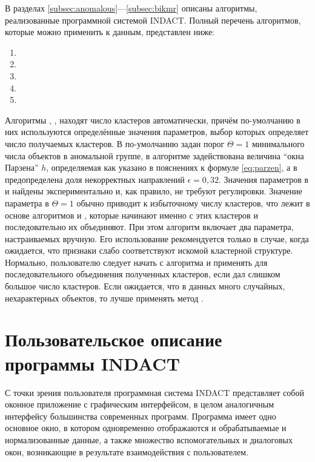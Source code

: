 \documentclass[12pt]{diploma}
\begin{document}
	В разделах \ref{subsec:anomalous}---\ref{subsec:bikmr} описаны алгоритмы, реализованные программной системой INDACT. Полный  перечень алгоритмов, которые можно применить к данным, представлен ниже:
	
	\begin{enumerate}
		\item \ikmeans
		\item \AWard
		\item \AWardpb
		\item \dePDDP
		\item \BiKMR
	\end{enumerate}
	
	
	Алгоритмы \ikmeans, \dePDDP, \BiKMR находят число кластеров автоматически, причём по-умолчанию в них используются определённые значения параметров, выбор которых определяет число получаемых кластеров. В \ikmeans по-умолчанию задан порог $ \Theta=1 $ минимального числа объектов в аномальной группе, в алгоритме \dePDDP задействована величина ``окна Парзена'' $ h $, определяемая как указано в пояснениях к формуле \eqref{eq:parzen}, а в \BiKMR предопределена доля некорректных направлений $ \epsilon=0,32 $. Значения параметров в \dePDDP и \BiKMR найдены  экспериментально и, как правило, не требуют регулировки. Значение параметра в \ikmeans $ \Theta=1 $ обычно приводит к избыточному числу кластеров, что лежит в основе алгоритмов \AWard и \AWardpb, которые начинают именно с этих кластеров и последовательно их объединяют. При этом алгоритм \AWardpb включает два параметра, настраиваемых вручную. Его использование рекомендуется только в случае, когда ожидается, что признаки слабо соответствуют искомой кластерной структуре. Нормально, пользователю следует начать с алгоритма \ikmeans и применять \AWard для последовательного объединения полученных кластеров, если \ikmeans дал слишком большое число кластеров. Если ожидается, что в данных много случайных, нехарактерных объектов, то лучше применять метод \BiKMR.
	
	\section{Пользовательское описание программы INDACT}
	
	С точки зрения пользователя программная система INDACT представляет собой оконное приложение с графическим интерфейсом, в целом аналогичным интерфейсу большинства современных программ. Программа имеет одно основное окно, в котором одновременно отображаются и обрабатываемые и нормализованные данные, а также множество вспомогательных и диалоговых окон, возникающие в результате взаимодействия с пользователем. 
	
\end{document}
